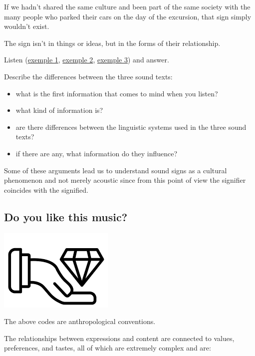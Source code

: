 If we hadn't shared the same culture and been part of the same society with the many people who parked their cars on the day of the excursion, that sign simply wouldn't exist.

The sign isn't in things or ideas, but in the forms of their relationship.

Listen (\href{http://www.musicaecodice.it/gitmedia/emc/1_media/miles.mp3}{exemple 1}, \href{http://www.musicaecodice.it/gitmedia/emc/1_media/rameau.mp3}{exemple 2}, \href{http://www.musicaecodice.it/gitmedia/emc/1_media/gamelan.mp3}{exemple 3}) and answer.

Describe the differences between the three sound texts: 

\begin{itemize}
\tightlist
\item what is the first information that comes to mind when you listen? 
\item what kind of information is? 
\item are there differences between the linguistic systems used in the three sound texts? \item if there are any, what information do they influence?
\end{itemize}

Some of these arguments lead us to understand sound signs as a cultural phenomenon and not merely acoustic since from this point of view the signifier coincides with the signified.

\subsection{Do you like this music?}\label{do-you-like-this-music}

\begin{center}
\includegraphics[scale=0.4]{../img/valore.png}
\end{center}

The above codes are anthropological conventions.

The relationships between expressions and content are connected to values, preferences, and tastes, all of which are extremely complex and are:

